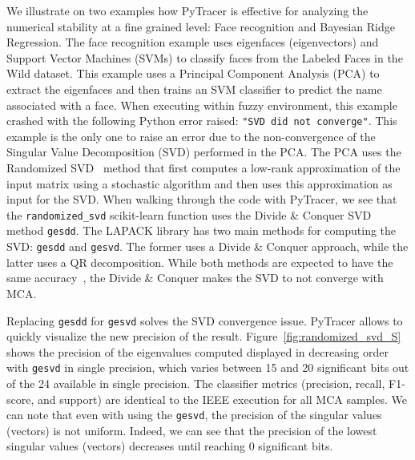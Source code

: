 \documentclass[10pt,journal,compsoc]{IEEEtran}
\newcommand{\pytracer}[0]{PyTracer\xspace}
\DeclareRobustCommand{\add}[1]{#1}
\begin{document}
\add{We illustrate on two examples how PyTracer is effective for analyzing
    the numerical stability at a fine grained level: Face recognition and Bayesian Ridge Regression.}
The face recognition example uses eigenfaces (eigenvectors) and Support Vector
Machines (SVMs) to classify faces from the Labeled Faces in the Wild dataset.
This example uses a Principal Component Analysis (PCA) to extract the eigenfaces
and then trains an SVM classifier to predict the name associated with a face.
\add{When executing within fuzzy environment, this example crashed with the following
    Python error raised: \texttt{"SVD did not converge"}.}
This example is the only one to raise an error due to the
non-convergence of the Singular Value Decomposition (SVD) performed in the PCA.
The PCA uses the Randomized SVD~\cite{halko2011finding} method
that first computes a low-rank approximation of the input matrix using a
stochastic algorithm and then uses this approximation as input for the SVD. 
\add{When walking through the code with PyTracer, we see that}
the \texttt{randomized\_svd} scikit-learn function uses the Divide \& Conquer SVD
method \texttt{gesdd}. The LAPACK library has two main methods for computing the SVD:
\texttt{gesdd} and \texttt{gesvd}. The former uses a Divide \& Conquer approach,
while the latter uses a QR decomposition. While both methods are expected to
have the same accuracy~\cite{nakatsukasa2013stable}, the Divide \& Conquer
makes the SVD to not converge with MCA.

Replacing \texttt{gesdd} for \texttt{gesvd} solves the SVD convergence issue.
\pytracer allows to quickly visualize the new precision of the result.
Figure~\ref{fig:randomized_svd_S} shows the precision of the eigenvalues
computed displayed in decreasing order with \texttt{gesvd} \add{in single precision}, 
which varies between 15 and 20
significant bits out of the 24 available in single precision. The classifier
metrics (precision, recall, F1-score, and support) are identical to the IEEE
execution for all MCA samples. \add{We can note that even with using the \texttt{gesvd},
    the precision of the singular values (vectors) is not uniform. 
    Indeed, we can see that the precision of the lowest singular values (vectors) decreases 
    until reaching 0 significant bits.}
\end{document}
